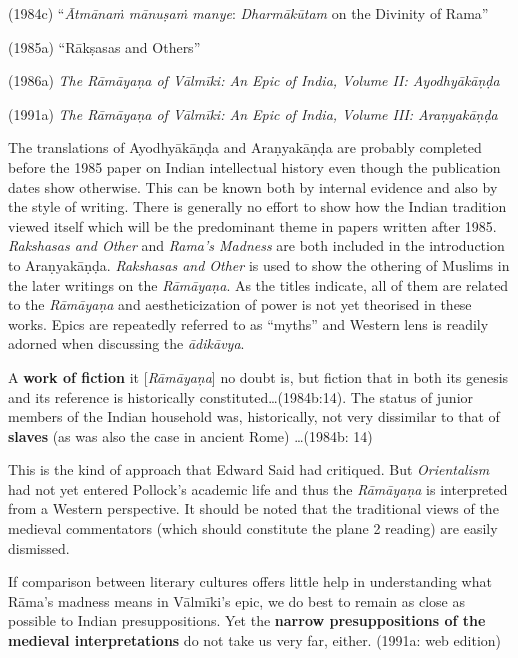 (1984c) “\textit{Ātmānaṁ mānuṣaṁ manye}: \textit{Dharmākūtam} on the Divinity of Rama”

(1985a) “Rākṣasas and Others”

(1986a)\textit{ The Rāmāyaṇa of Vālmīki: An Epic of India, Volume II: Ayodhyākāṇḍa}

(1991a)\textit{ The Rāmāyaṇa of Vālmīki: An Epic of India, Volume III: Araṇyakāṇḍa}

The translations of Ayodhyākāṇḍa and Araṇyakāṇḍa are probably completed before the 1985 paper on Indian intellectual history even though the publication dates show otherwise. This can be known both by internal evidence and also by the style of writing. There is generally no effort to show how the Indian tradition viewed itself which will be the predominant theme in papers written after 1985. \textit{Rakshasas and Other} and \textit{Rama’s Madness} are both included in the introduction to Araṇyakāṇḍa. \textit{Rakshasas and Other} is used to show the othering of Muslims in the later writings on the \textit{Rāmāyaṇa}. As the titles indicate, all of them are related to the \textit{Rāmāyaṇa} and aestheticization of power is not yet theorised in these works. Epics are repeatedly referred to as “myths” and Western lens is readily adorned when discussing the \textit{ādikāvya}.

\begin{myquote}
A \textbf{work of fiction} it [\textit{Rāmāyaṇa}] no doubt is, but fiction that in both its genesis and its reference is historically constituted…(1984b:14). The status of junior members of the Indian household was, historically, not very dissimilar to that of \textbf{slaves} (as was also the case in ancient Rome) …(1984b: 14)
\end{myquote}

This is the kind of approach that Edward Said had critiqued. But \textit{Orientalism }had not yet entered Pollock’s academic life and thus the \textit{Rāmāyaṇa }is interpreted from a Western perspective. It should be noted that the traditional views of the medieval commentators (which should constitute the plane 2 reading) are easily dismissed.

\begin{myquote}
If comparison between literary cultures offers little help in understanding what Rāma’s madness means in Vālmīki’s epic, we do best to remain as close as possible to Indian presuppositions. Yet the \textbf{narrow presuppositions of the medieval interpretations }do not take us very far, either. (1991a: web edition)
\end{myquote}

